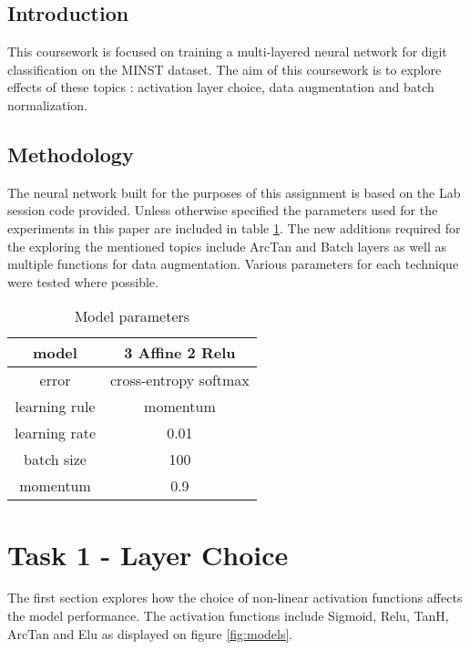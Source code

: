 \documentclass[12pt]{article}
\begin{document}
\maketitle


\subsection*{Introduction}
This coursework is focused on training a multi-layered neural network for digit classification on the MINST dataset. The aim of this coursework is to explore effects of these topics : activation layer choice, data augmentation and batch normalization.


\subsection*{Methodology}

The neural network built for the purposes of this assignment is based on the Lab session code provided. Unless otherwise specified the parameters used for the experiments in this paper are included in table \ref{tab:model}. The new additions required for the exploring the mentioned topics include ArcTan and Batch layers as well as multiple functions for data augmentation. Various parameters for each technique were tested where possible.


\begin{table}[H]
\centering
\begin{tabular}[h]{| c | c |}
\hline
model & 3 Affine 2 Relu   \\
\hline
error & cross-entropy softmax   \\
\hline
learning rule & momentum   \\
\hline
learning rate & 0.01\\
\hline 
batch size & 100   \\
\hline
momentum & 0.9   \\
\hline
\end{tabular} 
\caption{Model parameters}
\label{tab:model}
\end{table}




\section*{Task 1 - Layer Choice}

The first section explores how the choice of non-linear activation functions affects the model performance. The activation functions include Sigmoid, Relu, TanH, ArcTan and Elu as displayed on figure \ref{fig:models}.  
\end{document}
